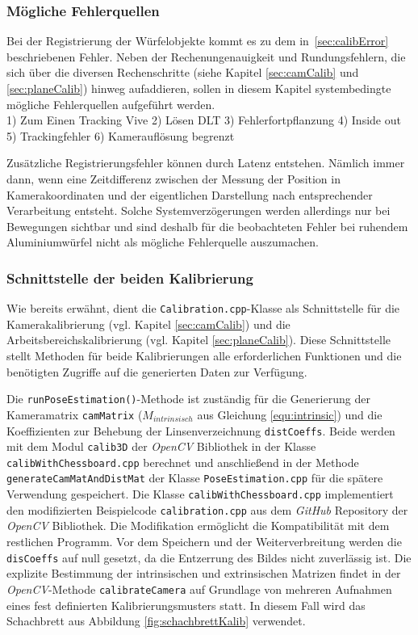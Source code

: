 \subsubsection{Mögliche Fehlerquellen} \label{sec:calibErrorSources}
Bei der Registrierung der Würfelobjekte kommt es zu dem in~\ref{sec:calibError} beschriebenen Fehler.
Neben der Rechenungenauigkeit und Rundungsfehlern, die sich über die diversen Rechenschritte (siehe Kapitel \ref{sec:camCalib} und \ref{sec:planeCalib}) hinweg aufaddieren, sollen in diesem Kapitel systembedingte mögliche Fehlerquellen aufgeführt werden. \\


1) Zum Einen Tracking Vive
2) Lösen DLT
3) Fehlerfortpflanzung
4) Inside out
5) Trackingfehler
6) Kamerauflösung begrenzt

Zusätzliche Registrierungsfehler können durch Latenz entstehen. Nämlich immer dann, wenn eine Zeitdifferenz zwischen der Messung der Position in Kamerakoordinaten und der eigentlichen Darstellung nach entsprechender
Verarbeitung entsteht. Solche Systemverzögerungen werden allerdings nur bei Bewegungen sichtbar und sind deshalb für die beobachteten Fehler bei ruhendem Aluminiumwürfel nicht als mögliche Fehlerquelle auszumachen. 
\subsubsection{Schnittstelle der beiden Kalibrierung} \label{sec:CalibSteuerung}
Wie bereits erwähnt, dient die \texttt{Calibration.cpp}-Klasse als Schnittstelle für die Kamerakalibrierung (vgl. Kapitel \ref{sec:camCalib}) und die Arbeitsbereichskalibrierung (vgl. Kapitel \ref{sec:planeCalib}). Diese Schnittstelle stellt Methoden für beide Kalibrierungen alle erforderlichen Funktionen und die benötigten Zugriffe auf die generierten Daten zur Verfügung. 

Die \texttt{runPoseEstimation()}-Methode ist zuständig für die Generierung der Kameramatrix \texttt{camMatrix}  ($M_{intrinsisch}$ aus Gleichung \ref{equ:intrinsic})  und die Koeffizienten zur Behebung der Linsenverzeichnung \texttt{distCoeffs}. Beide werden mit dem Modul \texttt{calib3D} der \textit{OpenCV} Bibliothek in der Klasse \texttt{calibWithChessboard.cpp} berechnet und anschließend in der Methode \texttt{generateCamMatAndDistMat} der Klasse \texttt{PoseEstimation.cpp} für die spätere  Verwendung gespeichert. 
Die Klasse \texttt{calibWithChessboard.cpp} implementiert den modifizierten Beispielcode \texttt{calibration.cpp} \cite{website:calibexample} aus dem \textit{GitHub} Repository der \textit{OpenCV} Bibliothek. Die Modifikation ermöglicht die Kompatibilität mit dem restlichen Programm. Vor dem Speichern und der Weiterverbreitung werden die \texttt{disCoeffs} auf null gesetzt, da die Entzerrung des Bildes nicht zuverlässig ist. Die explizite Bestimmung der intrinsischen und extrinsischen Matrizen findet in der \textit{OpenCV}-Methode \texttt{calibrateCamera} auf Grundlage von mehreren Aufnahmen eines fest definierten Kalibrierungsmusters statt. In diesem Fall wird das Schachbrett aus Abbildung \ref{fig:schachbrettKalib} verwendet. 

